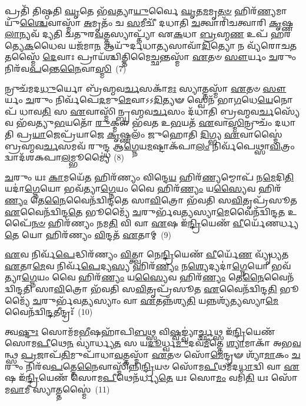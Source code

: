 𑌪𑍍𑌰𑌤𑌿᳴ 𑌤𑌿𑌷𑍍𑌠𑌤𑌿 \ul{𑌘𑍃}\-𑌤𑍇 𑌭᳴\-\ul{𑌵}\-𑌤𑍍𑌯𑌾\-\ul{𑌯𑍁}\-𑌰𑍍𑌵𑍈 \ul{𑌘𑍃}\-𑌤\-\ul{𑌮}\-𑌮𑍃\-\ul{𑌤}\-\-\ul{𑍞} 𑌹𑌿𑌰᳴\-\ul{𑌣𑍍𑌯}\-𑌮𑌾𑌯𑍁᳴\-\ul{𑌶𑍍𑌚𑍈}\-𑌵𑌾\-𑌸𑍍𑌮𑌾᳴ \ul{𑌅}\-𑌮𑍃𑌤𑌂᳴ 𑌚 \ul{𑌸}\-𑌮𑍀𑌚𑍀᳴ 𑌦𑌧𑌾𑌤𑌿 \ul{𑌚}\-𑌤𑍍𑌵𑌾𑌰𑌿᳴𑌚𑌤𑍍𑌵𑌾𑌰𑌿 \ul{𑌕𑍃}\-𑌷𑍍𑌣\-\ul{𑌲𑌾}\-𑌨𑍍𑌯𑌵᳴ 𑌦𑍍𑌯𑌤𑌿 𑌚𑌤𑍁𑌰\-\ul{𑌵}\-𑌤𑍍𑌤𑌸𑍍𑌯𑌾𑌪𑍍𑌤𑍍𑌯𑌾᳴ 𑌏\-\ul{𑌕}\-𑌧𑌾 \ul{𑌬𑍍𑌰}\-𑌹𑍍𑌮\-\ul{𑌣} 𑌉𑌪᳴ 𑌹𑌰𑌤𑍍𑌯𑍇\-\ul{𑌕}\-𑌧𑍈𑌵 𑌯𑌜᳴𑌮𑌾\-\ul{𑌨} 𑌆𑌯𑍁᳴𑌰𑍍𑌦𑌧𑌾\-\ul{𑌤𑍍𑌯}\-𑌸𑌾𑌵𑌾᳴\-\ul{𑌦𑌿}\-𑌤𑍍𑌯𑍋 𑌨 𑌵𑍍𑌯᳴𑌰𑍋𑌚\-\ul{𑌤} 𑌤𑌸𑍍𑌮𑍈᳴ \ul{𑌦𑍇}\-𑌵𑌾𑌃 𑌪𑍍𑌰𑌾𑌯᳴𑌶𑍍𑌚𑌿𑌤𑍍𑌤𑌿\-𑌮𑍈\-\ul{𑌚𑍍𑌛}\-𑌨𑍍𑌤𑌸𑍍𑌮𑌾᳴ \ul{𑌏}\-𑌤𑍞 \ul{𑌸𑍗}\-𑌰𑍍𑌯𑌂 \ul{𑌚}\-𑌰𑍁𑌂 𑌨𑌿𑌰᳴𑌵\-\ul{𑌪}\-𑌨𑍍𑌤𑍇\-\ul{𑌨𑍈}\-𑌵𑌾\-\ul{𑌸𑍍𑌮𑌿}\-~(7)

𑌨𑍍𑌰𑍁𑌚᳴𑌮𑌦\-\ul{𑌧𑍁}\-𑌰𑍍𑌯𑍋 𑌬𑍍𑌰᳴𑌹𑍍𑌮𑌵\-\ul{𑌰𑍍𑌚}\-𑌸𑌕𑌾᳴\-\ul{𑌮𑌃} 𑌸𑍍𑌯𑌾𑌤𑍍𑌤𑌸𑍍𑌮𑌾᳴ \ul{𑌏}\-𑌤𑍞 \ul{𑌸𑍗}\-𑌰𑍍𑌯𑌂 \ul{𑌚}\-𑌰𑍁𑌂 𑌨𑌿𑌰𑍍𑌵᳴𑌪𑍇\-\ul{𑌦}\-𑌮𑍁\-\ul{𑌮𑍇}\-𑌵𑌾𑌽𑌽\-\ul{𑌦𑌿}\-𑌤𑍍𑌯𑍟 𑌸𑍍𑌵𑍇𑌨᳴ 𑌭𑌾\-\ul{𑌗}\-𑌧𑍇\-\ul{𑌯𑍇}\-𑌨𑍋𑌪᳴ 𑌧𑌾𑌵\-\ul{𑌤𑌿} 𑌸 \ul{𑌏}\-𑌵𑌾𑌸𑍍𑌮𑌿᳴𑌨𑍍𑌬𑍍𑌰𑌹𑍍𑌮𑌵\-\ul{𑌰𑍍𑌚}\-𑌸𑌂 𑌦᳴𑌧𑌾𑌤𑌿 𑌬𑍍𑌰𑌹𑍍𑌮𑌵\-\ul{𑌰𑍍𑌚}\-𑌸𑍍𑌯𑍇᳴𑌵 𑌭᳴𑌵𑌤𑍍𑌯𑍁\-\ul{𑌭}\-𑌯𑌤𑍋᳴ \ul{𑌰𑍁}\-𑌕𑍍𑌮𑍗 𑌭᳴𑌵𑌤 𑌉\-\ul{𑌭}\-𑌯𑌤᳴ \ul{𑌏}\-𑌵𑌾\-\ul{𑌸𑍍𑌮𑌿}\-𑌨𑍍𑌰𑍁𑌚𑌂᳴ 𑌦𑌧𑌾𑌤𑌿 𑌪𑍍𑌰\-\ul{𑌯𑌾}\-𑌜𑍇𑌪𑍍𑌰᳴𑌯𑌾𑌜𑍇 \ul{𑌕𑍃}\-𑌷𑍍𑌣𑌲𑌂᳴ 𑌜𑍁𑌹𑍋𑌤𑌿 \ul{𑌦𑌿}\-𑌗𑍍𑌭𑍍𑌯 \ul{𑌏}\-𑌵𑌾𑌸𑍍𑌮𑍈॑ 𑌬𑍍𑌰𑌹𑍍𑌮𑌵\-\ul{𑌰𑍍𑌚}\-𑌸𑌮𑌵᳴ 𑌰𑍁𑌨𑍍𑌦𑍍𑌧 𑌆\-\ul{𑌗𑍍𑌨𑍇}\-𑌯\-\ul{𑌮}\-𑌷𑍍𑌟𑌾\-𑌕᳴𑌪𑌾\-\ul{𑌲𑌂} 𑌨𑌿𑌰𑍍𑌵᳴𑌪𑍇𑌥𑍍𑌸𑌾\-\ul{𑌵𑌿}\-𑌤𑍍𑌰𑌂 𑌦𑍍𑌵𑌾𑌦᳴𑌶\-𑌕𑌪𑌾\-\ul{𑌲}\-𑌮𑍍𑌭𑍂𑌮𑍍𑌯𑍈॑~(8)

\-\ul{𑌚}\-𑌰𑍁𑌂 𑌯𑌃 \ul{𑌕𑌾}\-𑌮𑌯𑍇᳴\-\ul{𑌤} 𑌹𑌿𑌰᳴𑌣𑍍𑌯𑌂 𑌵𑌿𑌨𑍍𑌦𑍇\-\ul{𑌯} 𑌹𑌿𑌰᳴\-\ul{𑌣𑍍𑌯}\-𑌮𑍍𑌮𑍋𑌪᳴ 𑌨\-\ul{𑌮𑍇}\-𑌦𑌿\-\ul{𑌤𑌿} 𑌯𑌦𑌾॑\-\ul{𑌗𑍍𑌨𑍇}\-𑌯𑍋 𑌭𑌵᳴𑌤𑍍𑌯𑌾\-\ul{𑌗𑍍𑌨𑍇}\-𑌯𑌂 𑌵𑍈 𑌹𑌿𑌰᳴\-\ul{𑌣𑍍𑌯𑌂} 𑌯\-\ul{𑌸𑍍𑌯𑍈}\-𑌵 𑌹𑌿𑌰᳴\-\ul{𑌣𑍍𑌯𑌂} 𑌤𑍇\-\ul{𑌨𑍈}\-𑌵𑍈𑌨᳴𑌦𑍍𑌵𑌿𑌨𑍍𑌦𑌤𑍇 𑌸𑌾\-\ul{𑌵𑌿}\-𑌤𑍍𑌰𑍋 𑌭᳴𑌵𑌤𑌿 𑌸\-\ul{𑌵𑌿}\-𑌤𑍃𑌪𑍍𑌰᳴𑌸𑍂𑌤 \ul{𑌏}\-𑌵𑍈𑌨᳴𑌦𑍍𑌵𑌿𑌨𑍍𑌦\-\ul{𑌤𑍇} 𑌭𑍂𑌮𑍍𑌯𑍈᳴ \ul{𑌚}\-𑌰𑍁𑌰𑍍𑌭᳴𑌵\-\ul{𑌤𑍍𑌯}\-𑌸𑍍𑌯𑌾\-\ul{𑌮𑍇}\-𑌵𑍈𑌨᳴𑌦𑍍𑌵𑌿𑌨𑍍𑌦\-\ul{𑌤} 𑌉𑌪𑍈᳴\-\ul{𑌨}\-\-\ul{𑍞} 𑌹𑌿𑌰᳴𑌣𑍍𑌯𑌂 𑌨𑌮\-\ul{𑌤𑌿} 𑌵𑌿 𑌵𑌾 \ul{𑌏}\-𑌷 𑌇᳴\-\ul{𑌨𑍍𑌦𑍍𑌰𑌿}\-𑌯𑍇𑌣᳴ \ul{𑌵𑍀}\-𑌰𑍍𑌯𑍇᳴𑌣𑌰𑍍𑌧𑍍𑌯\-\ul{𑌤𑍇} 𑌯𑍋 𑌹𑌿𑌰᳴𑌣𑍍𑌯𑌂 \ul{𑌵𑌿}\-𑌨𑍍𑌦𑌤᳴ \ul{𑌏}\-𑌤𑌾𑌮𑍍~(9)

\-\ul{𑌏}\-𑌵 𑌨𑌿𑌰𑍍𑌵᳴\-\ul{𑌪𑍇}\-𑌦𑍍𑌧𑌿𑌰᳴𑌣𑍍𑌯𑌂 \ul{𑌵𑌿}\-𑌤𑍍𑌤𑍍𑌵𑌾 𑌨𑍇\-\ul{𑌨𑍍𑌦𑍍𑌰𑌿}\-𑌯𑍇𑌣᳴ \ul{𑌵𑍀}\-𑌰𑍍𑌯𑍇᳴\-\ul{𑌣} 𑌵𑍍𑌯𑍃᳴𑌧𑍍𑌯𑌤 \ul{𑌏}\-𑌤𑌾\-\ul{𑌮𑍇}\-𑌵 𑌨𑌿𑌰𑍍𑌵᳴\-\ul{𑌪𑍇}\-𑌦𑍍𑌯\-\ul{𑌸𑍍𑌯} 𑌹𑌿𑌰᳴\-\ul{𑌣𑍍𑌯𑌂} 𑌨\-\ul{𑌶𑍍𑌯𑍇}\-𑌦𑍍𑌯𑌦𑌾॑\-\ul{𑌗𑍍𑌨𑍇}\-𑌯𑍋 𑌭𑌵᳴𑌤𑍍𑌯𑌾\-\ul{𑌗𑍍𑌨𑍇}\-𑌯𑌂 𑌵𑍈 𑌹𑌿𑌰᳴\-\ul{𑌣𑍍𑌯𑌂} 𑌯\-\ul{𑌸𑍍𑌯𑍈}\-𑌵 𑌹𑌿𑌰᳴\-\ul{𑌣𑍍𑌯𑌂} 𑌤𑍇\-\ul{𑌨𑍈}\-𑌵𑍈𑌨᳴𑌦𑍍𑌵𑌿𑌨𑍍𑌦𑌤𑌿 𑌸𑌾\-\ul{𑌵𑌿}\-𑌤𑍍𑌰𑍋 𑌭᳴𑌵𑌤𑌿 𑌸\-\ul{𑌵𑌿}\-𑌤𑍃𑌪𑍍𑌰᳴𑌸𑍂𑌤 \ul{𑌏}\-𑌵𑍈𑌨᳴𑌦𑍍𑌵𑌿𑌨𑍍𑌦\-\ul{𑌤𑌿} 𑌭𑍂𑌮𑍍𑌯𑍈᳴ \ul{𑌚}\-𑌰𑍁𑌰𑍍𑌭᳴𑌵\-\ul{𑌤𑍍𑌯}\-𑌸𑍍𑌯𑌾𑌂 𑌵𑌾 \ul{𑌏}\-𑌤𑌨𑍍𑌨᳴𑌶𑍍𑌯\-\ul{𑌤𑌿} 𑌯𑌨𑍍𑌨𑌶𑍍𑌯᳴\-\ul{𑌤𑍍𑌯}\-𑌸𑍍𑌯𑌾\-\ul{𑌮𑍇}\-𑌵𑍈𑌨᳴𑌦𑍍𑌵𑌿\-\ul{𑌨𑍍𑌦}\-𑌤𑍀𑌨𑍍𑌦𑍍𑌰𑌃᳴~(10)

𑌤𑍍𑌵\-\ul{𑌷𑍍𑌟𑍁𑌃} 𑌸𑍋𑌮᳴𑌮\-\ul{𑌭𑍀}\-𑌷𑌹𑌾᳴𑌪𑌿\-\ul{𑌬}\-𑌥𑍍𑌸 𑌵𑌿\-\ul{𑌷𑍍𑌵}\-𑌙𑍍𑌵𑍍𑌯𑌾॑\-\ul{𑌰𑍍𑌚𑍍𑌛}\-𑌥𑍍𑌸 𑌇᳴\-\ul{𑌨𑍍𑌦𑍍𑌰𑌿}\-𑌯𑍇𑌣᳴ 𑌸𑍋𑌮\-\ul{𑌪𑍀}\-𑌥𑍇\-\ul{𑌨} 𑌵𑍍𑌯𑌾॑𑌰𑍍𑌧𑍍𑌯\-\ul{𑌤} 𑌸 𑌯\-\ul{𑌦𑍂}\-𑌰𑍍𑌧𑍍𑌵\-\ul{𑌮𑍁}\-𑌦𑌵᳴\-\ul{𑌮𑍀}\-𑌤𑍍𑌤𑍇 \ul{𑌶𑍍𑌯𑌾}\-𑌮𑌾𑌕𑌾᳴ 𑌅𑌭\-\ul{𑌵}\-𑌨𑍍𑌥𑍍𑌸 \ul{𑌪𑍍𑌰}\-𑌜𑌾𑌪᳴\-\ul{𑌤𑌿}\-𑌮𑍁𑌪𑌾᳴𑌧𑌾\-\ul{𑌵}\-𑌤𑍍𑌤𑌸𑍍𑌮𑌾᳴ \ul{𑌏}\-𑌤𑍞 𑌸𑍋᳴\-\ul{𑌮𑍇}\-𑌨𑍍𑌦𑍍𑌰𑍟 𑌶𑍍𑌯𑌾᳴\-\ul{𑌮𑌾}\-𑌕𑌂 \ul{𑌚}\-𑌰𑍁𑌂 𑌨𑌿𑌰᳴𑌵\-\ul{𑌪}\-𑌤𑍍𑌤𑍇\-\ul{𑌨𑍈}\-𑌵𑌾𑌸𑍍𑌮𑌿᳴𑌨𑍍𑌨𑌿\-\ul{𑌨𑍍𑌦𑍍𑌰𑌿}\-𑌯𑍞 𑌸𑍋᳴𑌮\-\ul{𑌪𑍀}\-𑌥𑌮᳴𑌦\-\ul{𑌧𑌾}\-𑌦𑍍𑌵𑌿 𑌵𑌾 \ul{𑌏}\-𑌷 𑌇᳴\-\ul{𑌨𑍍𑌦𑍍𑌰𑌿}\-𑌯𑍇𑌣᳴ 𑌸𑍋𑌮\-\ul{𑌪𑍀}\-𑌥𑍇𑌨᳴𑌰𑍍𑌧𑍍𑌯\-\ul{𑌤𑍇} 𑌯𑌃 𑌸𑍋\-\ul{𑌮𑌂} 𑌵𑌮𑌿᳴\-\ul{𑌤𑌿} 𑌯𑌃 𑌸𑍋᳴𑌮\-\ul{𑌵𑌾}\-𑌮𑍀 𑌸𑍍𑌯𑌾𑌤𑍍𑌤𑌸𑍍𑌮𑍈॑~(11)

